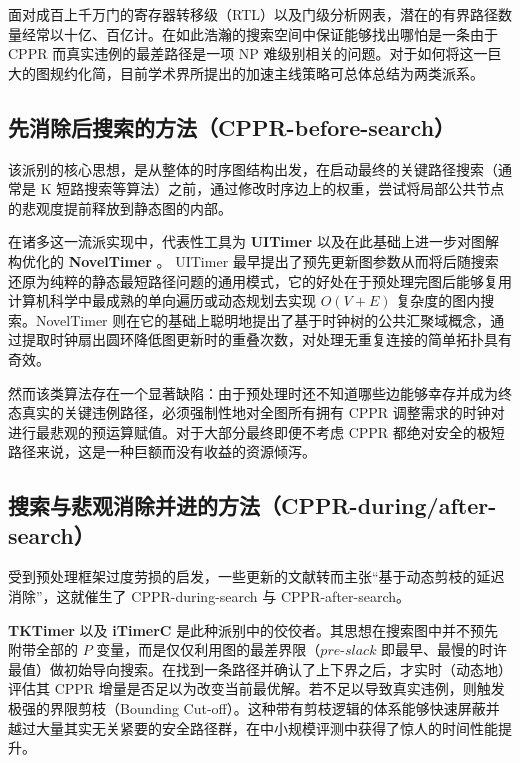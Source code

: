 面对成百上千万门的寄存器转移级（RTL）以及门级分析网表，潜在的有界路径数量经常以十亿、百亿计。在如此浩瀚的搜索空间中保证能够找出哪怕是一条由于 CPPR 而真实违例的最差路径是一项 NP 难级别相关的问题。对于如何将这一巨大的图规约化简，目前学术界所提出的加速主线策略可总体总结为两类派系。

\subsection{先消除后搜索的方法（CPPR-before-search）}
\label{subsec:cppr_before_search}
该派别的核心思想，是从整体的时序图结构出发，在启动最终的关键路径搜索（通常是 K 短路搜索等算法）之前，通过修改时序边上的权重，尝试将局部公共节点的悲观度提前释放到静态图的内部\cite{TODO_uitimer}。

在诸多这一流派实现中，代表性工具为 \textbf{UITimer} \cite{TODO_uitimer} 以及在此基础上进一步对图解构优化的 \textbf{NovelTimer} \cite{TODO_noveltimer}。
UITimer 最早提出了预先更新图参数从而将后随搜索还原为纯粹的静态最短路径问题的通用模式，它的好处在于预处理完图后能够复用计算机科学中最成熟的单向遍历或动态规划去实现 $O(V+E)$ 复杂度的图内搜索。NovelTimer 则在它的基础上聪明地提出了基于时钟树的公共汇聚域概念，通过提取时钟扇出圆环降低图更新时的重叠次数，对处理无重复连接的简单拓扑具有奇效。

然而该类算法存在一个显著缺陷：由于预处理时还不知道哪些边能够幸存并成为终态真实的关键违例路径，必须强制性地对全图所有拥有 CPPR 调整需求的时钟对进行最悲观的预运算赋值。对于大部分最终即便不考虑 CPPR 都绝对安全的极短路径来说，这是一种巨额而没有收益的资源倾泻。

\subsection{搜索与悲观消除并进的方法（CPPR-during/after-search）}
\label{subsec:cppr_after_search}
受到预处理框架过度劳损的启发，一些更新的文献转而主张“基于动态剪枝的延迟消除”，这就催生了 CPPR-during-search 与 CPPR-after-search。

\textbf{TKTimer} \cite{TODO_tktimer} 以及 \textbf{iTimerC} \cite{TODO_itimerc} 是此种派别中的佼佼者。其思想在搜索图中并不预先附带全部的 $P$ 变量，而是仅仅利用图的最差界限（$pre\text{-}slack$ 即最早、最慢的时许最值）做初始导向搜索。在找到一条路径并确认了上下界之后，才实时（动态地）评估其 CPPR 增量是否足以为改变当前最优解。若不足以导致真实违例，则触发极强的界限剪枝（Bounding Cut-off）。这种带有剪枝逻辑的体系能够快速屏蔽并越过大量其实无关紧要的安全路径群，在中小规模评测中获得了惊人的时间性能提升。

